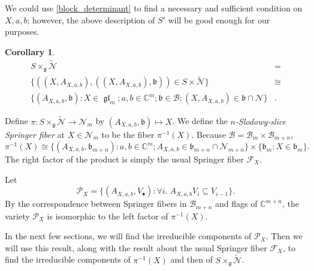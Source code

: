 \documentclass[12pt,psamsfonts]{article}
\DeclareMathOperator{\gl}{\mathfrak{gl}}
\newtheorem{corollary}[theorem]{Corollary}
\begin{document}
We could use \cref{block_determinant} to find a necessary and sufficient condition on \(X, a, b\); however, the above description of \(S'\) will be good enough for our purposes.
\begin{corollary}\label{sn_iso}
    \begin{align*}
        S \times_\mathfrak{g} \widetilde{\mathcal{N}} & = \\
        \{((X, A_{X, a, b}), ((X, A_{X, a, b}), \mathfrak{b})) \in S \times \widetilde{\mathcal{N}}\} & \cong \\
        \{(A_{X, a, b}, \mathfrak{b}) : X \in \gl_m; a,b \in \mathbb{C}^m; \mathfrak{b} \in \mathcal{B}; (X, A_{X, a, b}) \in \mathfrak{b} \cap \mathcal{N}\} & .
    \end{align*}
\end{corollary}
Define \(\pi : S \times_\mathfrak{g} \widetilde{\mathcal{N}} \to \mathcal{N}_m\) by \((A_{X, a, b}, \mathfrak{b}) \mapsto X\).
We define the \emph{\(n\)-Slodowy-slice Springer fiber} at \(X \in \mathcal{N}_m\) to be the fiber \(\pi^{-1}(X)\).
Because \(\mathcal{B} = \mathcal{B}_m \times \mathcal{B}_{m + n}\),  
\[\pi^{-1}(X) \cong \{(A_{X, a, b}, \mathfrak{b}_{m + n}) : a,b \in \mathbb{C}^m; A_{X, a, b} \in \mathfrak{b}_{m + n} \cap \mathcal{N}_{m + n}\} \times \{\mathfrak{b}_m : X \in \mathfrak{b}_m\}.\]
The right factor of the product is simply the usual Springer fiber \(\mathcal{F}_X\).
\par Let 
\[\mathcal{P}_X = \{(A_{X, a, b}, V_\bullet) : \forall i. \; A_{X, a, b} V_i \subseteq V_{i - 1}\}.\]
By the correspondence between Springer fibers in \(\mathcal{B}_{m + n}\) and flags of \(\mathbb{C}^{m + n}\), the variety \(\mathcal{P}_X\) is isomorphic to the left factor of \(\pi^{-1}(X)\).
\par In the next few sections, we will find the irreducible components of \(\mathcal{P}_X\).
Then we will use this result, along with the result about the usual Springer fiber \(\mathcal{F}_X\), to find the irreducible components of \(\pi^{-1}(X)\) and then of \(S \times_\mathfrak{g} \widetilde{\mathcal{N}}\).
\end{document}

